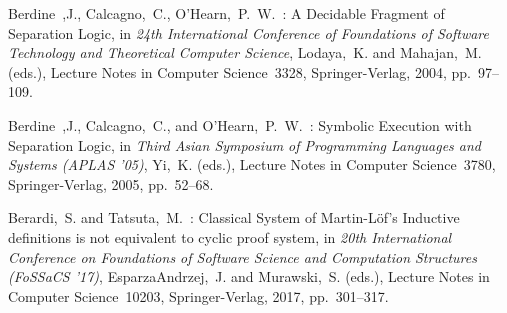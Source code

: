 
\def\lncs#1#2#3{Lecture Notes in Computer Science~#1, Springer-Verlag, #2, pp.~#3}
\def\editors#1{#1 (eds.)}
\def\editor#1{#1 (ed.)}
\def\berdine{Berdine~,J.}
\def\ohearn{O'Hearn,~P.~W.}
\def\calcagno{Calcagno~,C.}
\def\brotherston{Brotherston,~J.}
\def\gorogiannis{Gorogiannis,~N.}
\def\kanovich{Kanovich,~M.}
\def\yang{Yang,~H.}
\def\distefano{Distefano,~D.}
\def\enea{Enea,~C.}
\def\saveluc{Saveluc,~V.}
\def\sighireanu{Sighireanu,~M.}
\def\iosif{Iosif,~R.}
\def\rogalewicz{Rogalewicz,~A.}
\def\vojnar{Vojnar,~T.}
\def\chin{Chin,~W.~N.}

\begin{thebibliography}{99}
  

  \berdine, Calcagno,~C., \ohearn~:
  A Decidable Fragment of Separation Logic,
  in {\it 24th International Conference of Foundations of Software Technology and Theoretical Computer Science}, 
  \editors{Lodaya,~K. and Mahajan,~M.},
  \lncs{3328}{2004}{97--109}.

  \berdine, Calcagno,~C., and \ohearn~:
  Symbolic Execution with Separation Logic,
  in {\it Third Asian Symposium of Programming Languages and Systems (APLAS '05)}, 
  \editors{Yi,~K.},
  \lncs{3780}{2005}{52--68}.     





  Berardi,~S. and Tatsuta,~M.~: 
  Classical System of Martin-L{\"{o}}f's Inductive definitions is not equivalent to cyclic proof system,
  in {\it 20th International Conference on Foundations of Software Science and Computation Structures (FoSSaCS '17)},
  \editors{EsparzaAndrzej,~J. and Murawski,~S.},
  \lncs{10203}{2017}{301--317}. 


\end{thebibliography}
